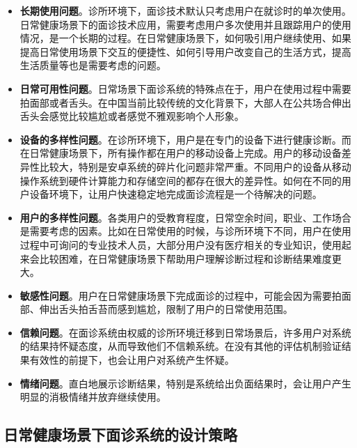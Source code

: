 \begin{itemize}
    
    \item \textbf{长期使用问题}。诊所环境下，面诊技术默认只考虑用户在就诊时的单次使用。日常健康场景下的面诊技术应用，需要考虑用户多次使用并且跟踪用户的使用情况，是一个长期的过程。在日常健康场景下，如何吸引用户继续使用、如果提高日常使用场景下交互的便捷性、如何引导用户改变自己的生活方式，提高生活质量等也是需要考虑的问题。
    
    \item \textbf{日常可用性问题}。日常场景下面诊系统的特殊点在于，用户在使用过程中需要拍面部或者舌头。在中国当前比较传统的文化背景下，大部人在公共场合伸出舌头会感觉比较尴尬或者感觉不雅观影响个人形象。

    \item \textbf{设备的多样性问题}。在诊所环境下，用户是在专门的设备下进行健康诊断。而在日常健康场景下，所有操作都在用户的移动设备上完成。用户的移动设备差异性比较大，特别是安卓系统的碎片化问题非常严重。不同用户的设备从移动操作系统到硬件计算能力和存储空间的都存在很大的差异性。如何在不同的用户设备环境下，让用户快速稳定地完成面诊流程是一个待解决的问题。
    
    \item \textbf{用户的多样性问题}。各类用户的受教育程度，日常空余时间，职业、工作场合是需要考虑的因素。比如在日常使用的时候，与诊所环境下不同，用户在使用过程中可询问的专业技术人员，大部分用户没有医疗相关的专业知识，使用起来会比较困难，在日常健康场景下帮助用户理解诊断过程和诊断结果难度更大。
    
    \item \textbf{敏感性问题}。用户在日常健康场景下完成面诊的过程中，可能会因为需要拍面部、伸出舌头拍舌苔而感到尴尬，限制了用户的日常使用范围。
    
    \item \textbf{信赖问题}。在面诊系统由权威的诊所环境迁移到日常场景后，许多用户对系统的结果持怀疑态度，从而导致他们不信赖系统。在没有其他的评估机制验证结果有效性的前提下，也会让用户对系统产生怀疑。
    
    \item \textbf{情绪问题}。直白地展示诊断结果，特别是系统给出负面结果时，会让用户产生明显的消极情绪并放弃继续使用。 

\end{itemize}

\subsection{日常健康场景下面诊系统的设计策略}

